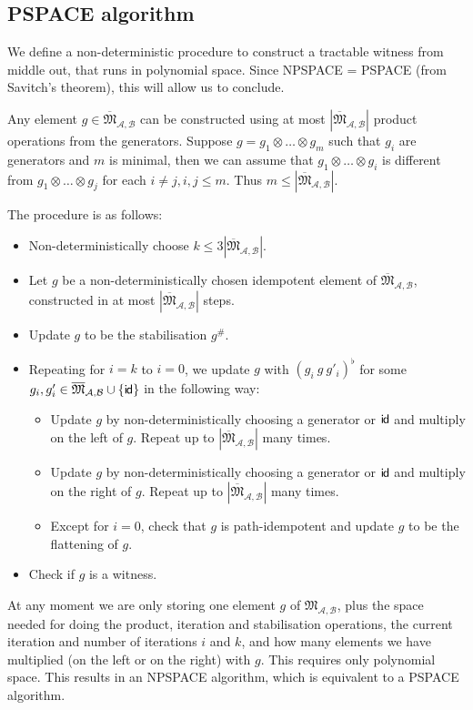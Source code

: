 \documentclass[10pt,a4paper]{amsart}
\theoremstyle{definition}
\numberwithin{equation}{section}
\theoremstyle{remark}
\newcommand{\ideal}{\mathfrak{M}}
\newcommand{\autA}{\mathcal{A}}
\newcommand{\autB}{\mathcal{B}}
\newcommand{\monoidid}{\mathsf{i\kern-0.8pt d}}
\theoremstyle{remark}
\begin{document}
\subsection{PSPACE algorithm}

We define a non-deterministic procedure to construct a tractable witness from middle out, that runs in polynomial space. Since NPSPACE = PSPACE (from Savitch's theorem), this will allow us to conclude.

Any element $g \in \overline{\ideal}_{\autA,\autB}$ can be constructed using at most ${|\overline{\ideal}_{\autA,\autB}|}$ product operations from the generators. Suppose $g= g_1\otimes \dots\otimes g_m$ such that $g_i$ are generators and $m$ is minimal, then we can assume that $g_1\otimes \dots\otimes g_i$ is different from  $g_1\otimes \dots\otimes g_j$ for each $i\ne j, i,j\le m$. Thus $m \le {|\overline{\ideal}_{\autA,\autB}|}$.

The procedure is as follows:
\begin{itemize} 
    \item Non-deterministically choose $k \le 3|\overline{\ideal}_{\autA,\autB}|$.
    \item Let $g$ be a non-deterministically chosen  idempotent element of $\overline{\ideal}_{\autA,\autB}$, constructed in at most ${|\overline{\ideal}_{\autA,\autB}|}$ steps.
    \item Update $g$ to be the stabilisation $g^\#$.
    \item Repeating for $i = k$ to $ i = 0$, we update $g$ with $(g_i \  g \ g'_{i})^\flat$ for some $g_i,g_i'\in  \overline{\ideal}_{\autA,\autB}\cup\{\monoidid\}$ in the following way:
    \begin{itemize}
    \item Update $g$ by non-deterministically choosing a generator or $\monoidid$ and multiply on the left of $g$. Repeat up to ${|\overline{\ideal}_{\autA,\autB}|}$ many times.
    \item Update $g$ by non-deterministically choosing a generator or $\monoidid$ and multiply on the right of $g$. Repeat up to ${|\overline{\ideal}_{\autA,\autB}|}$ many times.
    \item Except for $i = 0$, check that $g$ is path-idempotent and update $g$ to be the flattening of \nolinebreak $g$.
    \end{itemize}
    \item Check if $g$ is a witness.
\end{itemize}
At any moment we are only storing one element $g$ of $\ideal_{\autA,\autB}$, plus the space needed for doing the product, iteration and stabilisation operations, the  current iteration and number of iterations $i$ and $k$, and how many elements we have multiplied (on the left or on the right) with $g$. This requires only polynomial space.
This results in an NPSPACE algorithm, which is equivalent to a PSPACE algorithm.
\end{document}

